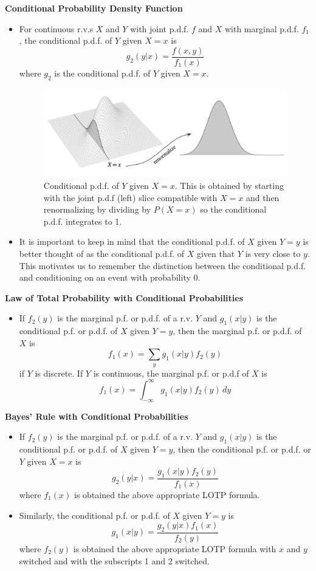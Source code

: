 \documentclass[11pt]{article}
\begin{document}
\textbf{Conditional Probability Density Function}
\begin{itemize}
    \item For continuous r.v.s $X$ and $Y$ with joint p.d.f. $f$ and $X$ with marginal p.d.f. 
    $f_1$, the conditional p.d.f. of $Y$ given $X=x$ is 
    \[g_2(y|x) = \frac{f(x,y)}{f_1(x)}\]
    where $g_2$ is the conditional p.d.f. of $Y$ given $X=x$.
    \begin{figure}[H] 
        \centering 
        \includegraphics[width=6in]{imgs/conditional_pdf.png}
        \caption{Conditional p.d.f. of $Y$ given $X=x$. This is obtained by starting with the 
        joint p.d.f (left) slice compatible with $X=x$ and then renormalizing by dividing by 
        $P(X=x)$ so the conditional p.d.f. integrates to 1.}
    \end{figure}
    \item It is important to keep in mind that the conditional p.d.f. of $X$ given $Y=y$ is 
    better thought of as the conditional p.d.f. of $X$ given that $Y$ is very close to $y$.
    This motivates us to remember the distinction between the conditional p.d.f. and 
    conditioning on an event with probability 0. 
\end{itemize}

\textbf{Law of Total Probability with Conditional Probabilities}
\begin{itemize}
    \item If $f_2(y)$ is the marginal p.f. or p.d.f. of a r.v. $Y$ and $g_1(x|y)$ is the 
    conditional p.f. or p.d.f. of $X$ given $Y=y$, then the marginal p.f. or p.d.f. of $X$ is
    \[f_1(x) = \sum_y g_1(x|y)f_2(y)\]
    if $Y$ is discrete. If $Y$ is continuous, the marginal p.f. or p.d.f of $X$ is 
    \[f_1(x) = \int_{-\infty}^{\infty} g_1(x|y)f_2(y) \,dy\]
\end{itemize}

\textbf{Bayes' Rule with Conditional Probabilities}
\begin{itemize}
    \item If $f_2(y)$ is the marginal p.f. or p.d.f. of a r.v. $Y$ and $g_1(x|y)$ is the 
    conditional p.f. or p.d.f. of $X$ given $Y=y$, then the conditional p.f. or p.d.f. or $Y$ 
    given $X=x$ is 
    \[g_2(y|x) = \frac{g_1(x|y)f_2(y)}{f_1(x)}\]
    where $f_1(x)$ is obtained the above appropriate LOTP formula.
    \item Similarly, the conditional p.f. or p.d.f. of $X$ given $Y=y$ is 
    \[g_1(x|y) = \frac{g_2(y|x)f_1(x)}{f_2(y)}\]
    where $f_2(y)$ is obtained the above appropriate LOTP formula with $x$ and $y$ switched and
    with the subscripts 1 and 2 switched.
\end{itemize}
\end{document}
